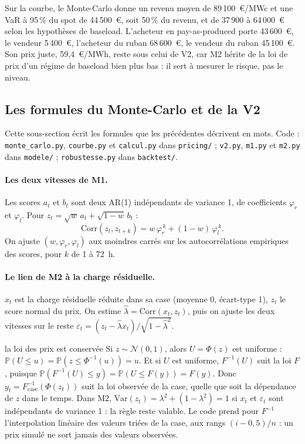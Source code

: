 \documentclass[11pt,a4paper]{article}
\newcommand{\code}[1]{\texttt{\small #1}}
\newcounter{qr}
\begin{document}
Sur la courbe, le Monte-Carlo donne un revenu moyen de 89\,100~€/MWc et une VaR à 95\,\% du spot de 44\,500~€, soit 50\,\% du revenu, et de 37\,900 à 64\,000~€ selon les hypothèses de baseload. L'acheteur en pay-as-produced porte 43\,600~€, le vendeur 5\,400~€, l'acheteur du ruban 68\,600~€, le vendeur du ruban 45\,100~€. Son prix juste, 59,4~€/MWh, reste sous celui de V2, car M2 hérite de la loi de prix d'un régime de baseload bien plus bas : il sert à mesurer le risque, pas le niveau.

\subsection{Les formules du Monte-Carlo et de la V2}
\label{sec:formules}

Cette sous-section écrit les formules que les précédentes décrivent en mots. Code : \code{monte\_carlo.py}, \code{courbe.py} et \code{calcul.py} dans \code{pricing/} ; \code{v2.py}, \code{m1.py} et \code{m2.py} dans \code{modele/} ; \code{robustesse.py} dans \code{backtest/}.

\paragraph{Les deux vitesses de M1.} Les scores $a_t$ et $b_t$ sont deux AR(1) indépendants de variance 1, de coefficients $\varphi_r$ et $\varphi_l$. Pour $z_t = \sqrt w\,a_t + \sqrt{1-w}\,b_t$ :
\[
\mathrm{Corr}(z_t, z_{t+k}) = w\,\varphi_r^{\,k} + (1-w)\,\varphi_l^{\,k}.
\]
On ajuste $(w, \varphi_r, \varphi_l)$ aux moindres carrés sur les autocorrélations empiriques des scores, pour $k$ de 1 à 72~h.

\paragraph{Le lien de M2 à la charge résiduelle.} $x_t$ est la charge résiduelle réduite dans sa case (moyenne 0, écart-type 1), $z_t$ le score normal du prix. On estime $\hat\lambda = \mathrm{Corr}(x_t, z_t)$, puis on ajuste les deux vitesses sur le reste $\varepsilon_t = (z_t - \hat\lambda x_t)/\sqrt{1-\hat\lambda^2}$.

\begin{demo}{la loi des prix est conservée}
Si $z \sim \mathcal N(0,1)$, alors $U = \Phi(z)$ est uniforme : $\mathbb P(U \le u) = \mathbb P(z \le \Phi^{-1}(u)) = u$. Et si $U$ est uniforme, $F^{-1}(U)$ suit la loi $F$, puisque $\mathbb P(F^{-1}(U) \le y) = \mathbb P(U \le F(y)) = F(y)$. Donc $y_t = F^{-1}_{\text{case}}(\Phi(z_t))$ suit la loi observée de la case, quelle que soit la dépendance de $z$ dans le temps. Dans M2, $\mathrm{Var}(z_t) = \lambda^2 + (1-\lambda^2) = 1$ si $x_t$ et $\varepsilon_t$ sont indépendants de variance 1 : la règle reste valable. Le code prend pour $F^{-1}$ l'interpolation linéaire des valeurs triées de la case, aux rangs $(i-0{,}5)/n$ : un prix simulé ne sort jamais des valeurs observées.
\end{demo}
\end{document}
